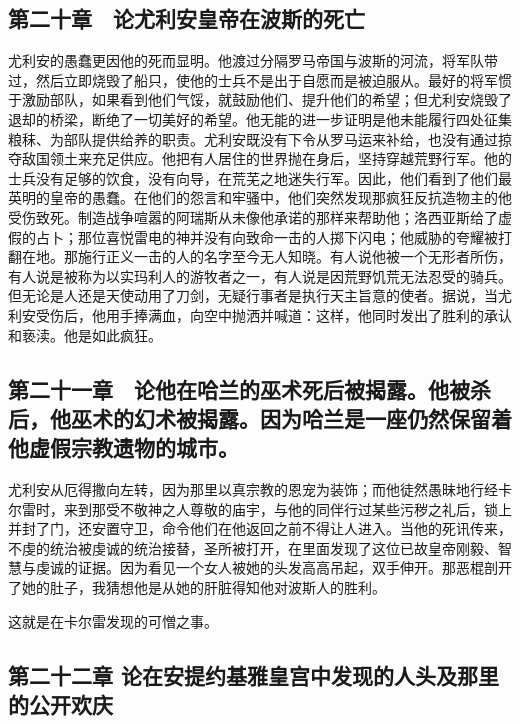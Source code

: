 \subsection{第二十章　论尤利安皇帝在波斯的死亡}

尤利安的愚蠢更因他的死而显明。他渡过分隔罗马帝国与波斯的河流，将军队带过，然后立即烧毁了船只，使他的士兵不是出于自愿而是被迫服从。最好的将军惯于激励部队，如果看到他们气馁，就鼓励他们、提升他们的希望；但尤利安烧毁了退却的桥梁，断绝了一切美好的希望。他无能的进一步证明是他未能履行四处征集粮秣、为部队提供给养的职责。尤利安既没有下令从罗马运来补给，也没有通过掠夺敌国领土来充足供应。他把有人居住的世界抛在身后，坚持穿越荒野行军。他的士兵没有足够的饮食，没有向导，在荒芜之地迷失行军。因此，他们看到了他们最英明的皇帝的愚蠢。在他们的怨言和牢骚中，他们突然发现那疯狂反抗造物主的他受伤致死。制造战争喧嚣的阿瑞斯从未像他承诺的那样来帮助他；洛西亚斯给了虚假的占卜；那位喜悦雷电的神并没有向致命一击的人掷下闪电；他威胁的夸耀被打翻在地。那施行正义一击的人的名字至今无人知晓。有人说他被一个无形者所伤，有人说是被称为以实玛利人的游牧者之一，有人说是因荒野饥荒无法忍受的骑兵。但无论是人还是天使动用了刀剑，无疑行事者是执行天主旨意的使者。据说，当尤利安受伤后，他用手捧满血，向空中抛洒并喊道：这样，他同时发出了胜利的承认和亵渎。他是如此疯狂。\par


\subsection{第二十一章　论他在哈兰的巫术死后被揭露。他被杀后，他巫术的幻术被揭露。因为哈兰是一座仍然保留着他虚假宗教遗物的城市。}

尤利安从厄得撒向左转，因为那里以真宗教的恩宠为装饰；而他徒然愚昧地行经卡尔雷时，来到那受不敬神之人尊敬的庙宇，与他的同伴行过某些污秽之礼后，锁上并封了门，还安置守卫，命令他们在他返回之前不得让人进入。当他的死讯传来，不虔的统治被虔诚的统治接替，圣所被打开，在里面发现了这位已故皇帝刚毅、智慧与虔诚的证据。因为看见一个女人被她的头发高高吊起，双手伸开。那恶棍剖开了她的肚子，我猜想他是从她的肝脏得知他对波斯人的胜利。\par

这就是在卡尔雷发现的可憎之事。\par


\subsection{第二十二章  论在安提约基雅皇宫中发现的人头及那里的公开欢庆}

